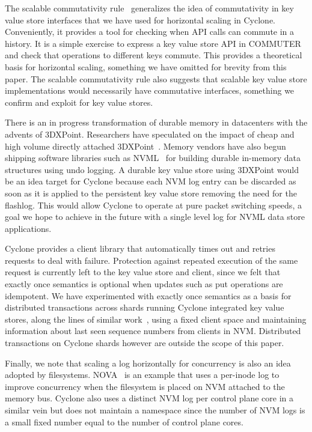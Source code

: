 \documentclass[pageno]{jpaper}
\begin{document}
The scalable commutativity rule~\cite{scalable_commutativity} generalizes the
idea of commutativity in key value store interfaces that we have used for
horizontal scaling in Cyclone. Conveniently, it provides a tool for checking when
API calls can commute in a history. It is a simple exercise to express a key
value store API in COMMUTER and check that operations to different keys
commute. This provides a theoretical basis for horizontal scaling, something we
have omitted for brevity from this paper. The scalable commutativity rule also
suggests that scalable key value store implementations would necessarily have
commutative interfaces, something we confirm and exploit for key
value stores.

There is an in progress transformation of durable memory in datacenters
with the advents of 3DXPoint. Researchers have speculated on the impact of cheap
and high volume directly attached 3DXPoint~\cite{tiering}. Memory vendors have
also begun shipping software libraries such as NVML~\cite{nvml} for building durable
in-memory data structures using undo logging. A durable key value store using
3DXPoint would be an idea target for Cyclone because each NVM log entry can be
discarded as soon as it is applied to the persistent key value store removing
the need for the flashlog. This would allow Cyclone to operate at pure packet
switching speeds, a goal we hope to achieve in the future with a single level
log for NVML data store applications.

Cyclone provides a client library that automatically times out and retries
requests to deal with failure. Protection against repeated execution of the same
request is currently left to the key value store and client, since we felt that
exactly once semantics is optional when updates such as put operations are
idempotent. We have experimented with exactly once semantics as a basis for
distributed transactions across shards running Cyclone integrated key value
stores, along the lines of similar work~\cite{raft_lin}, using a fixed client
space and maintaining information about last seen sequence numbers from clients
in NVM. Distributed transactions on Cyclone shards however are outside the scope
of this paper.

Finally, we note that scaling a log horizontally for concurrency is also an idea
adopted by filesystems. NOVA~\cite{nova} is an example that uses a per-inode log
to improve concurrency when the filesystem is placed on NVM attached to the
memory bus. Cyclone also uses a distinct NVM log per control plane core in a
similar vein but does not maintain a namespace since the number of NVM logs is a
small fixed number equal to the number of control plane cores.
\end{document}
